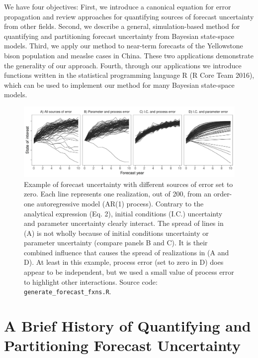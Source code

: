 \documentclass[12pt,]{article}
\begin{document}
We have four objectives: First, we introduce a canonical equation for
error propagation and review approaches for quantifying sources of
forecast uncertainty from other fields. Second, we describe a general,
simulation-based method for quantifying and partitioning forecast
uncertainty from Bayesian state-space models. Third, we apply our method
to near-term forecasts of the Yellowstone bison population and measlse
cases in China. These two applications demonstrate the generality of our
approach. Fourth, through our applications we introduce functions
written in the statistical programming language R (R Core Team 2016),
which can be used to implement our method for many Bayesian state-space
models.

\begin{figure}
\centering
\includegraphics{../figures/forecast_uncertainty_example.pdf}
\caption{Example of forecast uncertainty with different sources of error
set to zero. Each line represents one realization, out of 200, from an
order-one autoregressive model (AR(1) process). Contrary to the
analytical expression (Eq. 2), initial conditions (I.C.) uncertainty and
parameter uncertainty clearly interact. The spread of lines in (A) is
not wholly because of initial conditions uncertainty or parameter
uncertainty (compare panels B and C). It is their combined influence
that causes the spread of realizations in (A and D). At least in this
example, process error (set to zero in D) does appear to be independent,
but we used a small value of process error to highlight other
interactions. Source code: \texttt{generate\_forecast\_fxns.R}.}
\end{figure}

\hypertarget{a-brief-history-of-quantifying-and-partitioning-forecast-uncertainty}{%
\section{A Brief History of Quantifying and Partitioning Forecast
Uncertainty}\label{a-brief-history-of-quantifying-and-partitioning-forecast-uncertainty}}
\end{document}
